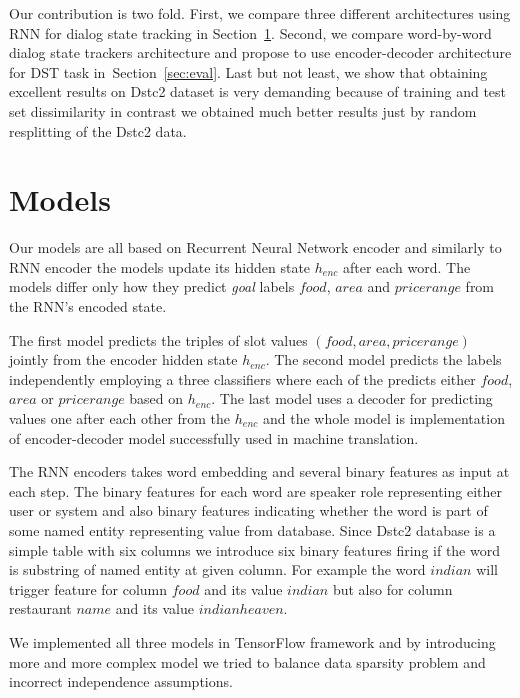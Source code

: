 \documentclass{itatnew}
\begin{document}
Our contribution is two fold. 
First, we compare three different architectures using RNN for dialog state tracking in Section~\ref{sec:model}.
Second, we compare word-by-word dialog state trackers architecture and propose to use encoder-decoder architecture for DST task in~Section~\ref{sec:eval}.
Last but not least, we show that obtaining excellent results on Dstc2 dataset is very demanding because of training and test set dissimilarity in contrast we obtained much better results just by random resplitting of the Dstc2 data.

\section{Models}
\label{sec:model}

Our models are all based on Recurrent Neural Network encoder\cite{werbos1990backpropagation} and similarly to RNN encoder\cite{zilka2015incremental} the models update its hidden state $h_{enc}$ after each word.
The models differ only how they predict {\it goal} labels $food$, $area$ and $price range$ from the RNN's encoded state.

The first model predicts the triples of slot values $(food, area, price range)$ jointly from the encoder hidden state $h_{enc}$.
The second model predicts the labels independently employing a three classifiers where each of the predicts either $food$, $area$ or $price range$ based on $h_{enc}$. 
The last model uses a decoder for predicting values one after each other from the $h_{enc}$ and the whole model is implementation of encoder-decoder model successfully used in machine translation\cite{bahdanau2014neural}.

The RNN encoders takes word embedding and several binary features as input at each step.
The binary features for each word are speaker role representing either user or system and also binary features indicating whether the word is part of some named entity representing value from database.
Since Dstc2 database is a simple table with six columns we introduce six binary features firing if the word is substring of named entity at given column.
For example the word $indian$ will trigger feature for column $food$ and its value $indian$ but also for column restaurant $name$ and its value $indian heaven$.

We implemented all three models in TensorFlow\cite{abaditensorflow} framework and by introducing more and more complex model we tried to balance data sparsity problem and incorrect independence assumptions.
\end{document}
